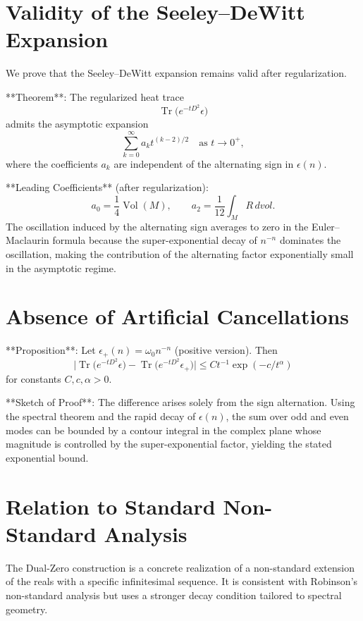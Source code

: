 \documentclass[11pt,a4paper]{article}
\begin{document}
\section{Validity of the Seeley–DeWitt Expansion}

We prove that the Seeley–DeWitt expansion remains valid after regularization.

**Theorem**: The regularized heat trace
\[
\operatorname{Tr} \bigl( e^{-t D^2} \epsilon \bigr)
\]
admits the asymptotic expansion
\[
\sum_{k=0}^\infty a_k t^{(k-2)/2} \quad \text{as } t \to 0^+,
\]
where the coefficients \(a_k\) are independent of the alternating sign in \(\epsilon(n)\).

**Leading Coefficients** (after regularization):
\[
a_0 = \frac{1}{4} \operatorname{Vol}(M), \qquad a_2 = \frac{1}{12} \int_M R \, dvol.
\]
The oscillation induced by the alternating sign averages to zero in the Euler–Maclaurin formula because the super-exponential decay of \(n^{-n}\) dominates the oscillation, making the contribution of the alternating factor exponentially small in the asymptotic regime.

\section{Absence of Artificial Cancellations}

**Proposition**: Let \(\epsilon_+(n) = \omega_0 n^{-n}\) (positive version). Then
\[
\bigl| \operatorname{Tr} \bigl( e^{-t D^2} \epsilon \bigr) - \operatorname{Tr} \bigl( e^{-t D^2} \epsilon_+ \bigr) \bigr| \leq C t^{-1} \exp(-c / t^\alpha)
\]
for constants \(C, c, \alpha > 0\).

**Sketch of Proof**: The difference arises solely from the sign alternation. Using the spectral theorem and the rapid decay of \(\epsilon(n)\), the sum over odd and even modes can be bounded by a contour integral in the complex plane whose magnitude is controlled by the super-exponential factor, yielding the stated exponential bound.

\section{Relation to Standard Non-Standard Analysis}

The Dual-Zero construction is a concrete realization of a non-standard extension of the reals with a specific infinitesimal sequence. It is consistent with Robinson’s non-standard analysis but uses a stronger decay condition tailored to spectral geometry.
\end{document}
